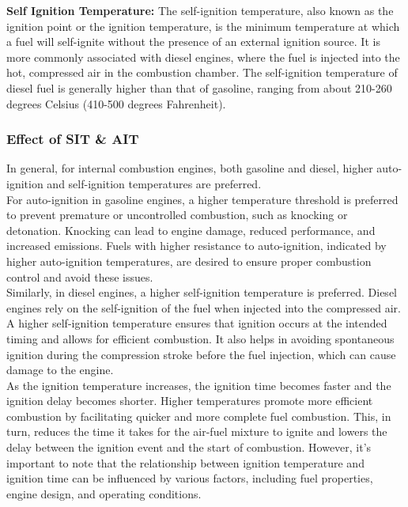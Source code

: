 \documentclass{article}
\begin{document}
\textbf{Self Ignition Temperature:} The self-ignition temperature, also known as the ignition point or the ignition temperature, is the minimum temperature at which a fuel will self-ignite without the presence of an external ignition source. It is more commonly associated with diesel engines, where the fuel is injected into the hot, compressed air in the combustion chamber. The self-ignition temperature of diesel fuel is generally higher than that of gasoline, ranging from about 210-260 degrees Celsius (410-500 degrees Fahrenheit).

\subsubsection*{Effect of SIT \& AIT}
In general, for internal combustion engines, both gasoline and diesel, higher auto-ignition and self-ignition temperatures are preferred.\\

For auto-ignition in gasoline engines, a higher temperature threshold is preferred to prevent premature or uncontrolled combustion, such as knocking or detonation. Knocking can lead to engine damage, reduced performance, and increased emissions. Fuels with higher resistance to auto-ignition, indicated by higher auto-ignition temperatures, are desired to ensure proper combustion control and avoid these issues.\\

Similarly, in diesel engines, a higher self-ignition temperature is preferred. Diesel engines rely on the self-ignition of the fuel when injected into the compressed air. A higher self-ignition temperature ensures that ignition occurs at the intended timing and allows for efficient combustion. It also helps in avoiding spontaneous ignition during the compression stroke before the fuel injection, which can cause damage to the engine.\\

As the ignition temperature increases, the ignition time becomes faster and the ignition delay becomes shorter. Higher temperatures promote more efficient combustion by facilitating quicker and more complete fuel combustion. This, in turn, reduces the time it takes for the air-fuel mixture to ignite and lowers the delay between the ignition event and the start of combustion. However, it's important to note that the relationship between ignition temperature and ignition time can be influenced by various factors, including fuel properties, engine design, and operating conditions. 
\end{document}
